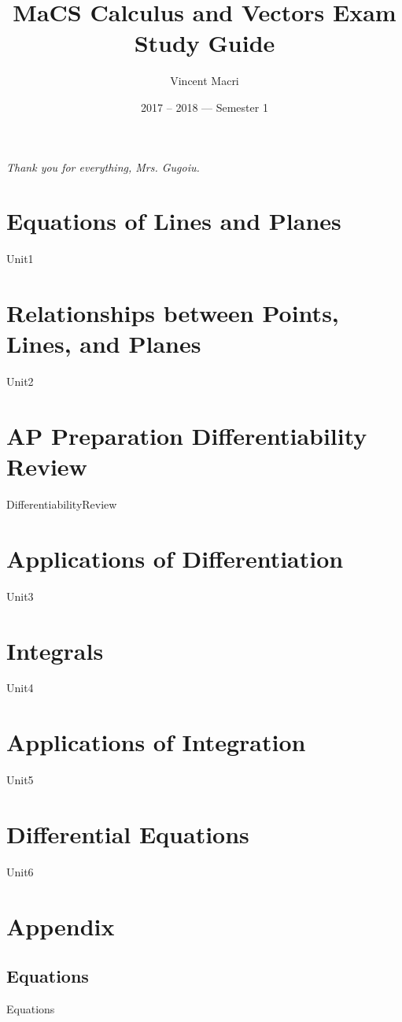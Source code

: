 \documentclass[letterpaper,12pt]{report}
\title{MaCS Calculus and Vectors Exam Study Guide}
\author{Vincent Macri}
\date{2017 -- 2018 --- Semester 1}
\begin{document}
	\maketitle
	\clearpage
	\vspace*{\fill}
	\begin{center}
		\Huge
		\textit{Thank you for everything, Mrs. Gugoiu.}
	\end{center}
	\vspace*{\fill}
	\clearpage
	\tableofcontents
	\clearpage

	\part{Equations of Lines and Planes}
		{Unit1}
	\part{Relationships between Points, Lines, and Planes}
		{Unit2}
	\part*{AP Preparation Differentiability Review}
		{DifferentiabilityReview}
	\part{Applications of Differentiation}
		{Unit3}
	\part{Integrals}
		{Unit4}
	\part{Applications of Integration}
		{Unit5}
	\part{Differential Equations}
		{Unit6}
	
	\appendix
	\part*{Appendix}
	\chapter{Equations}
		{Equations}
\end{document}
